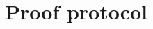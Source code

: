 \documentclass[../midgard.tex]{subfiles}
\begin{document}
\chapter{Proof protocol}
\label{h:proof-protocol}
\end{document}
